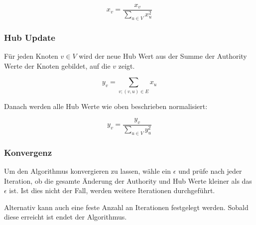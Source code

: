 \[ x_{v} =  \frac{x_{v}}{\sum_{u \in V} x_{u}^{2}} \]

\subsubsection{Hub Update}

Für jeden Knoten $ v \in V $ wird der neue Hub Wert aus der Summe der Authority Werte der Knoten gebildet, auf die $v$ zeigt.

\[ y_{v} = \sum_{v; (v, u) \in E} x_{u} \]

Danach werden alle Hub Werte wie oben beschrieben normalisiert:

\[ y_{v} =  \frac{y_{v}}{\sum_{u \in V} y_{u}^{2}} \]

\subsubsection{Konvergenz}

Um den Algorithmus konvergieren zu lassen, wähle ein $ \epsilon $ und prüfe nach jeder Iteration, ob die gesamte Änderung der Authority
und Hub Werte kleiner als das $ \epsilon $ ist. Ist dies nicht der Fall, werden weitere Iterationen durchgeführt.


Alternativ kann auch eine feste Anzahl an Iterationen festgelegt werden. Sobald diese erreicht ist endet der Algorithmus.
